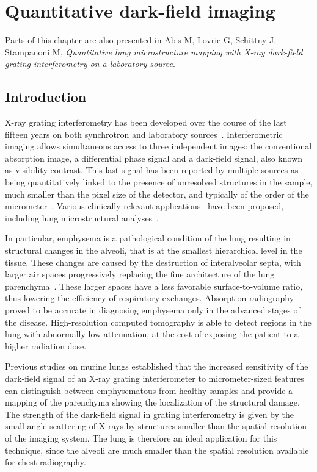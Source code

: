\chapter{Quantitative dark-field imaging}\label{ch:lung-dark-field}
Parts of this chapter are also presented in Abis M, Lovric G, Schittny J, Stampanoni
M, \emph{Quantitative lung microstructure mapping with X-ray dark-field grating interferometry on a laboratory source}.
\section{Introduction}\label{sec:introduction}
X-ray grating interferometry has been developed over the course of the last
fifteen years on both synchrotron and laboratory
sources~\parencite{David_2002,1347-4065-42-7B-L866,Weitkamp_2005,1347-4065-45-6R-5254,Pfeiffer2006}.
Interferometric imaging allows simultaneous access to three independent
images: the conventional absorption image, a differential phase signal and a
dark-field signal, also known as visibility contrast. This last signal has
been reported by multiple sources as being quantitatively linked to the
presence of unresolved structures in the sample, much smaller than the pixel
size of the detector, and typically of the order of the
micrometer~\parencite{Pfeiffer2008,Lynch:11,Yashiro:10}. Various clinically
relevant applications~\parencite{Wen_2009,Thilo2013} have been
proposed, including lung microstructural analyses~\parencite{Schleede17880,Meinel_2014,Meinel_2013,Yaroshenko_2013}.

In particular, emphysema is a pathological condition of the lung
resulting in structural changes in the alveoli, that is at the smallest
hierarchical level in the tissue. These changes are caused by the
destruction of interalveolar septa, with larger air spaces progressively
replacing the fine architecture of the lung
parenchyma~\parencite{Sharafkhaneh_2008}. These larger spaces have a less
favorable surface-to-volume ratio, thus lowering the efficiency
of respiratory exchanges. Absorption radiography proved to be accurate in
diagnosing emphysema only in the advanced stages of the disease. 
High-resolution computed tomography is able to detect regions in the lung
with abnormally low attenuation, at the cost of exposing the patient
to a higher radiation dose.

Previous studies on murine lungs established that the increased sensitivity of
the dark-field signal of an X-ray grating interferometer to micrometer-sized
features can distinguish between emphysematous from healthy samples and
provide a mapping of the parenchyma showing the localization of the
structural damage.
The strength of the dark-field signal in grating interferometry is
given by the small-angle scattering of X-rays by structures smaller than the
spatial resolution of the imaging system. The lung is therefore an ideal
application for this technique, since the alveoli are much
smaller than the spatial resolution available for chest radiography.

